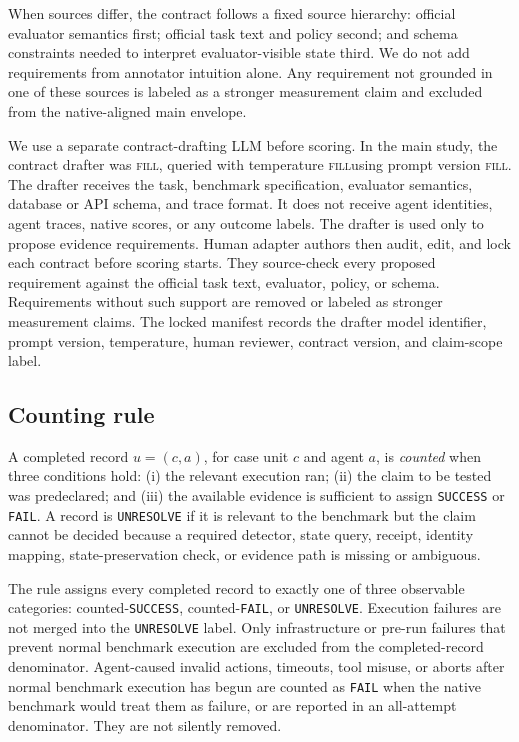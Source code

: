 \documentclass{article}
\newcommand{\fillfromdata}{\textsc{fill}}
\providecommand{\ContractDrafterModel}{\fillfromdata}
\providecommand{\ContractDrafterTemperature}{\fillfromdata}
\providecommand{\ContractPromptVersion}{\fillfromdata}
\begin{document}
When sources differ, the contract follows a fixed source hierarchy: official
evaluator semantics first; official task text and policy second; and schema
constraints needed to interpret evaluator-visible state third. We do not add
requirements from annotator intuition alone. Any requirement not grounded in one
of these sources is labeled as a stronger measurement claim and excluded from
the native-aligned main envelope.

We use a separate contract-drafting LLM before scoring. In the main study, the
contract drafter was \ContractDrafterModel, queried with temperature
\ContractDrafterTemperature using prompt version \ContractPromptVersion. The
drafter receives the task, benchmark specification, evaluator semantics,
database or API schema, and trace format. It does not receive agent identities,
agent traces, native scores, or any outcome labels. The drafter is used only to
propose evidence requirements. Human adapter authors then audit, edit, and lock
each contract before scoring starts. They source-check every proposed
requirement against the official task text, evaluator, policy, or schema.
Requirements without such support are removed or labeled as stronger
measurement claims. The locked manifest records the drafter model identifier,
prompt version, temperature, human reviewer, contract version, and claim-scope
label.

\subsection{Counting rule}

A completed record \(u=(c,a)\), for case unit \(c\) and agent \(a\), is
\emph{counted} when three conditions hold: (i) the relevant execution ran; (ii)
the claim to be tested was predeclared; and (iii) the available evidence is
sufficient to assign \texttt{SUCCESS} or \texttt{FAIL}. A record is
\texttt{UNRESOLVE} if it is relevant to the benchmark but the claim cannot be
decided because a required detector, state query, receipt, identity mapping,
state-preservation check, or evidence path is missing or ambiguous.

The rule assigns every completed record to exactly one of three observable
categories: counted-\texttt{SUCCESS}, counted-\texttt{FAIL}, or
\texttt{UNRESOLVE}. Execution failures are not merged into the
\texttt{UNRESOLVE} label. Only infrastructure or pre-run failures that prevent
normal benchmark execution are excluded from the completed-record denominator.
Agent-caused invalid actions, timeouts, tool misuse, or aborts after normal
benchmark execution has begun are counted as \texttt{FAIL} when the native
benchmark would treat them as failure, or are reported in an all-attempt
denominator. They are not silently removed.
\end{document}
